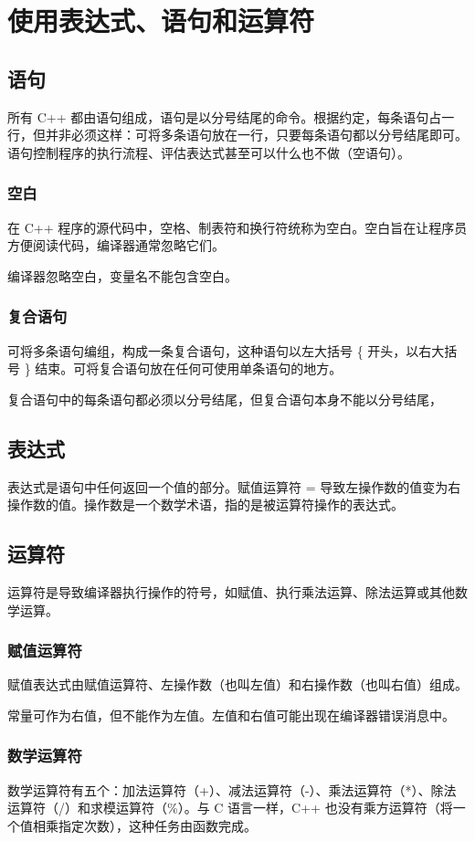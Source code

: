 \chapter{使用表达式、语句和运算符}
\section{语句}
所有 C++ 都由语句组成，语句是以分号结尾的命令。根据约定，每条语句占一行，但并非必须这样：可将多条语句放在一行，只要每条语句都以分号结尾即可。语句控制程序的执行流程、评估表达式甚至可以什么也不做（空语句）。
\subsection*{空白}
在 C++ 程序的源代码中，空格、制表符和换行符统称为空白。空白旨在让程序员方便阅读代码，编译器通常忽略它们。

编译器忽略空白，变量名不能包含空白。
\subsection*{复合语句}
可将多条语句编组，构成一条复合语句，这种语句以左大括号 \{ 开头，以右大括号 \} 结束。可将复合语句放在任何可使用单条语句的地方。

复合语句中的每条语句都必须以分号结尾，但复合语句本身不能以分号结尾，
\section{表达式}
表达式是语句中任何返回一个值的部分。赋值运算符 = 导致左操作数的值变为右操作数的值。操作数是一个数学术语，指的是被运算符操作的表达式。
\section{运算符}
运算符是导致编译器执行操作的符号，如赋值、执行乘法运算、除法运算或其他数学运算。
\subsection*{赋值运算符}
赋值表达式由赋值运算符、左操作数（也叫左值）和右操作数（也叫右值）组成。

常量可作为右值，但不能作为左值。左值和右值可能出现在编译器错误消息中。

\subsection*{数学运算符}
数学运算符有五个：加法运算符（+）、减法运算符（-）、乘法运算符（*）、除法运算符（/）和求模运算符（\%）。与 C 语言一样，C++ 也没有乘方运算符（将一个值相乘指定次数），这种任务由函数完成。

